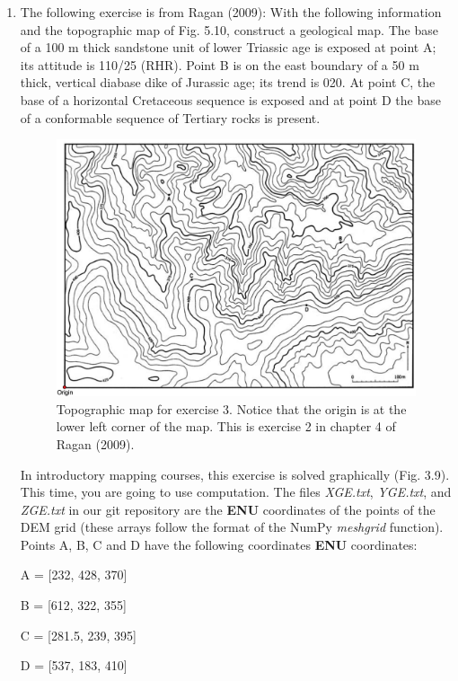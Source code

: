 \documentclass[a4paper , 12pt]{book}
\begin{document}
\begin{enumerate}
    \item The following exercise is from Ragan (2009): With the following information and the topographic map of Fig. 5.10, construct a geological map. The base of a 100 m thick sandstone unit of lower Triassic age is exposed at point A; its attitude is 110/25 (RHR). Point B is on the east boundary of a 50 m thick, vertical diabase dike of Jurassic age; its trend is 020. At point C, the base of a horizontal Cretaceous sequence is exposed and at point D the base of a conformable sequence of Tertiary rocks is present.
    
    \begin{figure}[H]
    \centering
    \includegraphics[width=13cm]{Figures/ch5f15.jpg}
    \caption{Topographic map for exercise 3. Notice that the origin is at the lower left corner of the map. This is exercise 2 in chapter 4 of Ragan (2009).}
    \end{figure}
    
    In introductory mapping courses, this exercise is solved graphically (Fig. 3.9). This time, you are going to use computation. The files \textit{XGE.txt}, \textit{YGE.txt}, and \textit{ZGE.txt} in our git repository are the \textbf{ENU} coordinates of the points of the DEM grid (these arrays follow the format of the NumPy \textit{meshgrid} function). Points A, B, C and D have the following coordinates \textbf{ENU} coordinates:
    
    A = [232, 428, 370]
    
    B = [612, 322, 355]
    
    C = [281.5, 239, 395]
    
    D = [537, 183, 410]
    

\end{enumerate}
\end{document}

